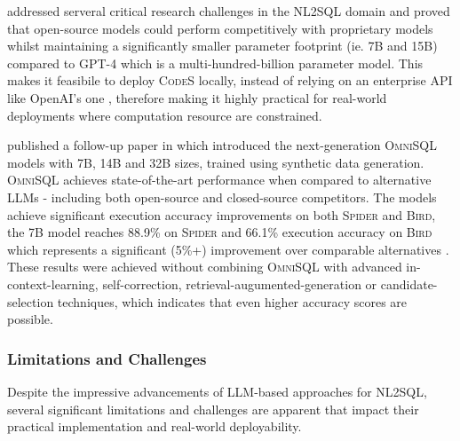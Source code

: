 \cite{CodeS} addressed serveral critical research challenges in the NL2SQL domain and proved that open-source models
could perform competitively with proprietary models whilst maintaining a significantly smaller parameter footprint
(ie. 7B and 15B) compared to GPT-4 which is a multi-hundred-billion parameter model. This makes it feasibile to deploy
\textsc{CodeS} locally, instead of relying on an enterprise API like OpenAI's one \citep{CodeS}, therefore making it
highly practical for real-world deployments where computation resource are constrained. 

\citeauthor*{OmniSQL} published a follow-up paper in \citeyear{OmniSQL} which introduced the next-generation \textsc{OmniSQL}
models with 7B, 14B and 32B sizes, trained using synthetic data generation. \textsc{OmniSQL} achieves state-of-the-art
performance when compared to alternative LLMs - including both open-source and closed-source competitors. The models
achieve significant execution accuracy improvements on both \textsc{Spider} and \textsc{Bird}, the 7B model reaches 88.9\%
on \textsc{Spider} and 66.1\% execution accuracy on \textsc{Bird} which represents a significant (5\%+) improvement over
comparable alternatives \citep{OmniSQL}. These results were achieved without combining \textsc{OmniSQL} with advanced
in-context-learning, self-correction, retrieval-augumented-generation or candidate-selection techniques, which indicates
that even higher accuracy scores are possible.

\subsubsection{Limitations and Challenges}

Despite the impressive advancements of LLM-based approaches for NL2SQL, several significant limitations and challenges
are apparent that impact their practical implementation and real-world deployability.

